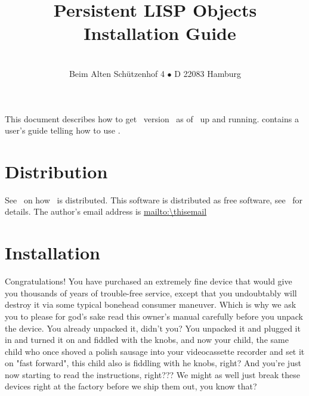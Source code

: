 %
%
\def\WideOption{}%
\def\ClassName{article}
\def\thistitle{Installation Guide}
\def\thispartnumber{IG}
%
%
%
\addtolength\textwidth      {20mm}%
\addtolength\evensidemargin {-20mm}%
\addtolength\textheight     {16.10072mm}%
\let\CodeSize\small
%


\newcommand{\lb}{\linebreak[0]}                 %
\def\osname{\textrm{\textit{\lt{}operating system name\gt}}}
\def\shortosname{\textrm{\textit{\lt{}opsys\gt}}}

\title{\ifx\avb\undefined\relax\else\avb\fi%
Persistent LISP Objects\\
\plob\ \thistitle}
\author{\thisauthor\\%
\normalsize Beim Alten Sch\"{u}tzenhof 4 $\bullet$ %
D 22083 Hamburg}%
\maketitle

This document describes how to get \plob\ version \thisversion\ as of
\thisdate\ up and running.  \cite{bib:PLOB-UsersGuide} contains a
user's guide telling how to use \plob.

\section{Distribution}

See \ on how \plob\ is distributed.
This software is distributed as free software, see \ for details. The author's email address is
\url{mailto:\thisemail}

\section{Installation}

\begin{fortune}[0.9\textwidth]
Congratulations!  You have purchased an extremely fine device that
would give you thousands of years of trouble-free service, except that
you undoubtably will destroy it via some typical bonehead consumer
maneuver.  Which is why we ask you to {\sc please for god's sake read
this owner's manual carefully before you unpack the device.  You
already unpacked it, didn't you?  You unpacked it and plugged it in
and turned it on and fiddled with the knobs, and now your child, the
same child who once shoved a polish sausage into your videocassette
recorder and set it on "fast forward", this child also is fiddling
with he knobs, right?  And you're just now starting to read the
instructions, right???  We might as well just break these devices
right at the factory before we ship them out, you know that?}
\end{fortune}%

